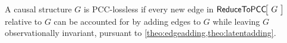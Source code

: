 \begin{prop}\label{prop:PCClossless}
A causal structure $G$ is PCC-lossless if every new edge in $\NamedFunction{ReduceToPCC}{\!G\!}$ relative to $G$ can be accounted for by adding edges to $G$ while leaving $G$ observationally invariant, pursuant to \cref{theo:edgeadding,theo:latentadding}.
\end{prop}

